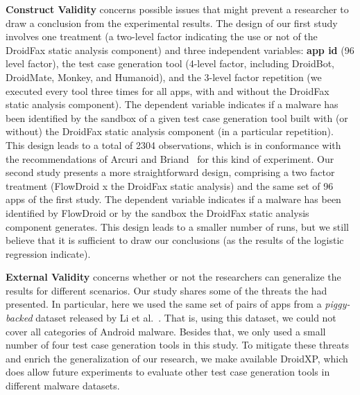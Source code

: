 \textbf{Construct Validity} concerns possible issues that might
prevent a researcher to draw a conclusion from the experimental
results. The design of our first study involves one treatment
(a two-level factor indicating the use or not of the
DroidFax static analysis component) and three independent
variables: {\bf app id} (96 level factor), the test
case generation tool (4-level factor, including DroidBot,
DroidMate, Monkey, and Humanoid), and the 3-level factor repetition
(we executed every tool three times for all apps, with and without
the DroidFax static analysis component). The dependent variable
indicates if a malware has been identified by the sandbox
of a given test case generation tool built with (or without) the
DroidFax static analysis component (in a particular repetition). This
design leads to a total of 2304 observations, which is in conformance with the recommendations
of Arcuri and Briand~\cite{arcuri:icse11} for this kind of experiment.
Our second study presents a more straightforward design, comprising a two
factor treatment (FlowDroid x the DroidFax static analysis) and   
the same set of 96 apps of the first study. The dependent variable
indicates if a malware has been identified by FlowDroid
or by the sandbox the DroidFax static analysis component generates. This
design leads to a smaller number of runs,
but we still believe that it is sufficient to draw our conclusions
(as the results of the logistic regression indicate).

\textbf{External Validity} concerns whether or not the
researchers can generalize the results for different scenarios.
Our study shares some of the threats the
\blls had presented. In particular, here we used the same set of pairs of apps from a \emph{piggy-backed} dataset
released by Li et al.~\cite{li2017understanding}. That is, using this dataset, we could not
cover all categories of Android malware. Besides that, we only used a small number of four test
case generation tools in this study. To mitigate these threats and enrich
the generalization of our research, we make available DroidXP, which does allow future
experiments to evaluate other test case generation tools in different malware
datasets.
